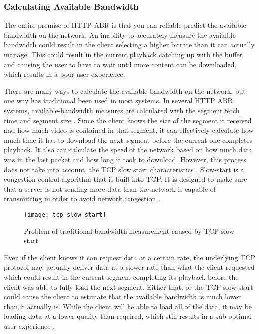\documentclass[12pt]{article}
\begin{document}
\subsubsection{Calculating Available Bandwidth}
The entire premise of HTTP ABR is that you can reliable predict the available bandwidth on the network.  An inability to accurately measure the avaialble bandwidth could result in the client selecting a higher bitrate than it can actually manage.  This could result in the current playback catching up with the buffer and causing the user to have to wait until more content can be downloaded, which results in a poor user experience.

There are many ways to calculate the available bandwidth on the network, but one way has traditional been used in most systems. In several HTTP ABR systems, available-bandwidth measures are calculated with the segment fetch time and segment size \cite{7057917}.  Since the client knows the size of the segment it received and how much video is contained in that segment, it can effectively calculate how much time it has to download the next segment before the current one completes playback.  It also can calculate the speed of the network based on how much data was in the last packet and how long it took to download.  However, this process does not take into account, the TCP slow start characteristics \cite{7057917}.  Slow-start is a congestion control algorithm that is built into TCP.  It is designed to make sure that a server is not sending more data than the network is capable of transmitting in order to avoid network congestion \cite{rfc5681}.

\begin{figure}[htp]
  \begin{center}
    \texttt{[image: tcp\_slow\_start]}
    \caption{Problem of traditional bandwidth measurement caused by TCP slow start}
    \label{fig:tcp_slow_start}
  \end{center}
\end{figure}

Even if the client knows it can request data at a certain rate, the underlying TCP protocol may actually deliver data at a slower rate than what the client requested which could result in the current segment completing its playback before the client was able to fully load the next segment.  Either that, or the TCP slow start could cause the client to estimate that the available bandwidth is much lower than it actually is.  While the client will be able to load all of the data, it may be loading data at a lower quality than required, which still results in a sub-optimal user experience \cite{7057917}.
\end{document}
